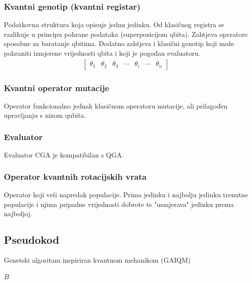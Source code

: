 \documentclass[times, utf8, zavrsni]{fer}
\begin{document}
\subsubsection{Kvantni genotip (kvantni registar)}
Podatkovna struktura koja opisuje jednu jedinku. Od klasičnog registra se razlikuje u principu pohrane podataka (superpozicijom qbita). Zahtjeva operatore sposobne za baratanje qbitima. Dodatno zahtjeva i klasični genotip koji može pohraniti izmjerene vrijednosti qbita i koji je pogodan evaluatoru.
\begin{align*}
\begin{bmatrix}
\theta_1 & \theta_2 & \theta_3 & \cdots & \theta_i & \cdots & \theta_n
\end{bmatrix}
\end{align*}

\subsubsection{Kvantni operator mutacije}
Operator funkcionalno jednak klasičnom operatoru mutacije, ali prilagođen upravljanju s nizom qubita.
\subsubsection{Evaluator}
Evaluator CGA je kompatibilan s QGA.
\subsubsection{Operator kvantnih rotacijskih vrata}
Operator koji vrši napredak populacije. Prima jedinku i najbolju jedinku trenutne populacije i njima pripadne vrijednosti dobrote te "usmjerava" jedinku prema najboljoj.

\subsection{Pseudokod}
\begin{algorithm}
\caption{Genetski algoritam inspiriran kvantnom mehanikom (GAIQM)}
\label{algo:gaiqm}
\begin{algorithmic}
\ENDWHILE
\RETURN $B$
\end{algorithmic}
\end{algorithm}
\end{document}
